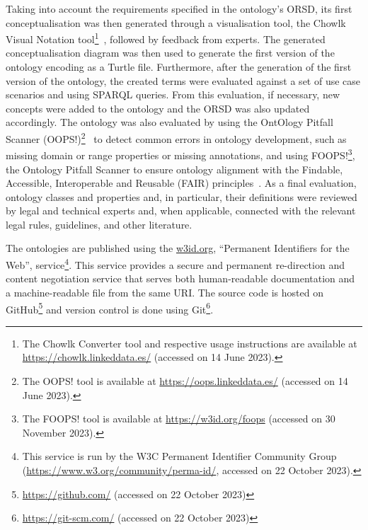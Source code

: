 Taking into account the requirements specified in the ontology's ORSD, its first conceptualisation was then generated through a visualisation tool, the Chowlk Visual Notation tool\footnote{The Chowlk Converter tool and respective usage instructions are available at \url{https://chowlk.linkeddata.es/} (accessed on 14 June 2023).}~\citep{chavez-feria_chowlk_2022}, followed by feedback from experts. The generated conceptualisation diagram was then used to generate the first version of the ontology encoding as a Turtle file.
Furthermore, after the generation of the first version of the ontology, the created terms were evaluated against a set of use case scenarios and using SPARQL queries. From this evaluation, if necessary, new concepts were added to the ontology and the ORSD was also updated accordingly. The ontology was also evaluated by using the OntOlogy Pitfall Scanner (OOPS!)\footnote{The OOPS! tool is available at \url{https://oops.linkeddata.es/} (accessed on 14 June 2023).}~\citep{poveda-villalon_oops_2014} to detect common errors in ontology development, such as missing domain or range properties or missing annotations, and using FOOPS!\footnote{The FOOPS! tool is available at \url{https://w3id.org/foops} (accessed on 30 November 2023).}, the Ontology Pitfall Scanner to ensure ontology alignment with the Findable, Accessible, Interoperable and Reusable (FAIR) principles~\citep{garijo_foops_2021}.
As a final evaluation, ontology classes and properties and, in particular, their definitions were reviewed by legal and technical experts and, when applicable, connected with the relevant legal rules, guidelines, and other literature.

The ontologies are published using the \url{w3id.org}, ``Permanent Identifiers for the Web'', service\footnote{This service is run by the W3C Permanent Identifier Community Group (\url{https://www.w3.org/community/perma-id/}, accessed on 22 October 2023).}.
This service provides a secure and permanent re-direction and content negotiation service that serves both human-readable documentation and a machine-readable file from the same URI.
The source code is hosted on GitHub\footnote{\url{https://github.com/} (accessed on 22 October 2023)} and version control is done using Git\footnote{\url{https://git-scm.com/} (accessed on 22 October 2023)}.

